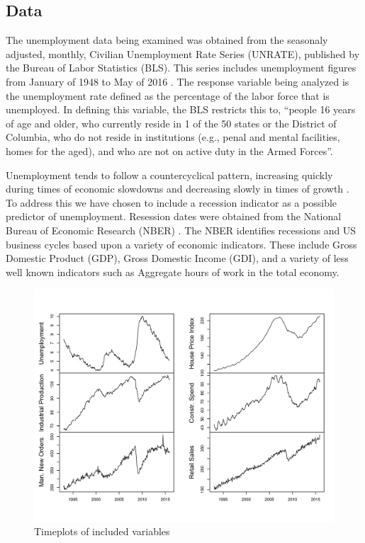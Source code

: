 \documentclass[twoside,twocolumn]{article}
\begin{document}
\subsection{Data}

The unemployment data being examined was obtained from the seasonaly adjusted, monthly, Civilian Unemployment Rate Series (UNRATE), published by the Bureau of Labor Statistics (BLS).  This series includes unemployment figures from January of 1948 to  May of 2016 \citep{blsrefsa}.  The response variable being analyzed is the unemployment rate defined as the percentage of the labor force that is unemployed.  In defining this variable, the BLS restricts this to, ``people 16 years of age and older, who currently reside in 1 of the 50 states or the District of Columbia, who do not reside in institutions (e.g., penal and mental facilities, homes for the aged), and who are not on active duty in the Armed Forces''.

Unemployment tends to follow a countercyclical pattern, increasing quickly during times of economic slowdowns and decreasing slowly in times of growth \citep{Montgomery1998}. To address this we have chosen to include a recession indicator as a possible predictor of unemployment. Resession dates were obtained from the National Bureau of Economic Research (NBER) \citep{NBER2016}. The NBER identifies recessions and US business cycles based upon a variety of economic indicators. These include Gross Domestic Product (GDP), Gross Domestic Income (GDI), and a variety of less well known indicators such as Aggregate hours of work in the total economy.

\begin{figure}[H]
	\centering
	\caption{Timeplots of included variables}
	\label{fig:predictors}
	\includegraphics[width=\linewidth]{images/predictors}
\end{figure}
\end{document}
